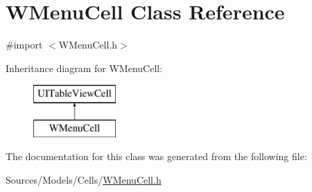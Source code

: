 \hypertarget{interface_w_menu_cell}{\section{W\-Menu\-Cell Class Reference}
\label{interface_w_menu_cell}
}


{\ttfamily \#import $<$W\-Menu\-Cell.\-h$>$}

Inheritance diagram for W\-Menu\-Cell\-:\begin{figure}[H]
\begin{center}
\leavevmode
\includegraphics[height=2.000000cm]{interface_w_menu_cell}
\end{center}
\end{figure}


The documentation for this class was generated from the following file\-:\begin{DoxyCompactItemize}
\item 
Sources/\-Models/\-Cells/\hyperlink{_w_menu_cell_8h}{W\-Menu\-Cell.\-h}\end{DoxyCompactItemize}
